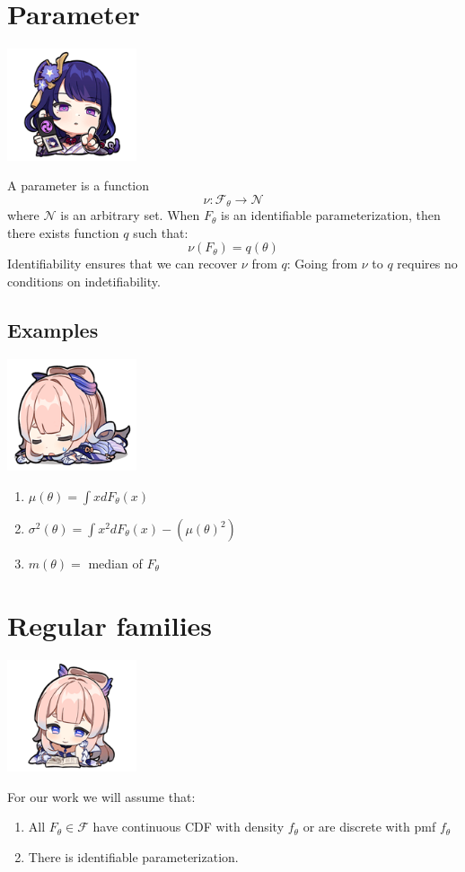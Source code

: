 \documentclass[oneside]{book}
\begin{document}
\section{Parameter}
\begin{marginfigure}%
    \includegraphics[width=1.5in]{chibis/file_004.png}
\end{marginfigure}%
A parameter is a function $$\nu:\mathcal{F}_\theta\to\mathcal N$$
where $\mathcal N$ is an arbitrary set. When $F_\theta$ is an identifiable parameterization, then there exists function $q$ such that:
$$\nu(F_\theta)=q(\theta)$$
Identifiability ensures that we can recover $\nu$ from $q$: Going from $\nu$ to $q$ requires no conditions on indetifiability. 
\subsection{Examples}
\begin{marginfigure}%
    \includegraphics[width=1.5in]{chibis/file_005.png}
\end{marginfigure}%
\begin{enumerate}
    \item $\mu(\theta)=\int xdF_\theta(x)$
    \item $\sigma^2(\theta)=\int x^2dF_\theta(x)-(\mu(\theta)^2)$
    \item $m(\theta)=$ median of $F_\theta$
\end{enumerate}

\section{Regular families}
\begin{marginfigure}%
    \includegraphics[width=1.5in]{chibis/file_006.png}
\end{marginfigure}%
For our work we will assume that:
\begin{enumerate}
    \item All $F_\theta\in\mathcal F$ have continuous CDF with density $f_\theta$ or are discrete with pmf $f_\theta$
    \item There is identifiable parameterization. 
\end{enumerate}
\end{document}
